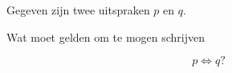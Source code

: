\documentclass{ximera}
\begin{document}
\begin{oefening}{\oefB\ESS}

Gegeven zijn twee uitspraken $p$ en $q$.

\begin{question}

Wat moet gelden om te mogen schrijven

\[
p\Leftrightarrow q?
\]

\begin{multipleChoice}




\end{multipleChoice}

\end{question}

\end{oefening}


\end{document}
